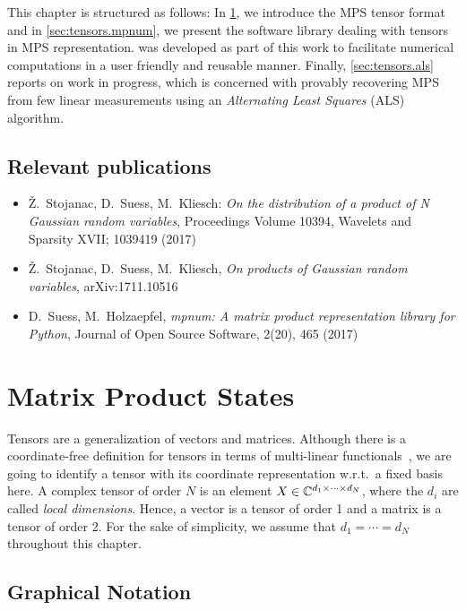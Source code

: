 This chapter is structured as follows:
In \cref{sec:tensors.mps}, we introduce the MPS tensor format and in \cref{sec:tensors.mpnum}, we present the software library \mpnum{} dealing with tensors in MPS representation.
\mpnum{} was developed as part of this work to facilitate numerical computations in a user friendly and reusable manner.
Finally, \cref{sec:tensors.als} reports on work in progress, which is concerned with provably recovering MPS from few linear measurements using an \emph{Alternating Least Squares} (ALS) algorithm.


\subsection*{Relevant publications}
\begin{itemize}
  \item Ž.\ Stojanac, D.\ Suess, M.\ Kliesch: \textit{On the distribution of a product of N Gaussian random variables}, Proceedings Volume 10394, Wavelets and Sparsity XVII; 1039419 (2017)
  \item Ž.\ Stojanac, D.\ Suess, M.\ Kliesch, \textit{On products of Gaussian random variables}, arXiv:1711.10516
  \item D.\ Suess, M.\ Holzaepfel, \textit{mpnum: A matrix product representation library for Python}, Journal of Open Source Software, 2(20), 465 (2017)
\end{itemize}
\section{Matrix Product States}%
\label{sec:tensors.mps}

Tensors are a generalization of vectors and matrices.
Although there is a coordinate-free definition for tensors in terms of multi-linear functionals~\cite{Browder_2012_Mathematical}, we are going to identify a tensor with its coordinate representation w.r.t.\ a fixed basis here.
A complex tensor of order $N$ is an element $X \in {\mathbb{C}}^{d_1 \times \cdots \times d_N}$, where the $d_i$ are called \emph{local dimensions}.
Hence, a vector is a tensor of order 1 and a matrix is a tensor of order 2.
For the sake of simplicity, we assume that $d_1 = \cdots = d_N$ throughout this chapter.



\subsection{Graphical Notation}%
\label{sub:mps.graphical_notation}

